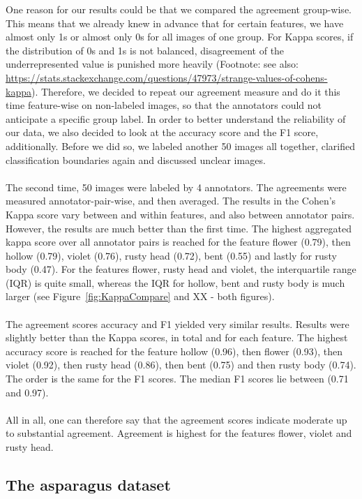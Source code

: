 One reason for our results could be that we compared the agreement group-wise. This means that we already knew in advance that for certain features, we have almost only 1s or almost only 0s for all images of one group. For Kappa scores, if the distribution of 0s and 1s is not balanced, disagreement of the underrepresented value is punished more heavily (Footnote: see also: \url{https://stats.stackexchange.com/questions/47973/strange-values-of-cohens-kappa}). Therefore, we decided to repeat our agreement measure and do it this time feature-wise on non-labeled images, so that the annotators could not anticipate a specific group label. In order to better understand the reliability of our data, we also decided to look at the accuracy score and the F1 score, additionally. Before we did so, we labeled another 50 images all together, clarified classification boundaries again and discussed unclear images. \\
\\
The second time, 50 images were labeled by 4 annotators. The agreements were measured annotator-pair-wise, and then averaged. The results in the Cohen’s Kappa score vary between and within features, and also between annotator pairs. However, the results are much better than the first time. The highest aggregated kappa score over all annotator pairs is reached for the feature flower (0.79), then hollow (0.79), violet (0.76), rusty head (0.72), bent (0.55) and lastly for rusty body (0.47).
For the features flower, rusty head and violet, the interquartile range (IQR) is quite small, whereas the IQR for hollow, bent and rusty body is much larger (see Figure~\ref{fig:KappaCompare} and XX - both figures).  \\
\\
The agreement scores accuracy and F1 yielded very similar results. Results were slightly better than the Kappa scores, in total and  for each feature. The highest accuracy score is reached for the feature hollow (0.96), then flower (0.93), then violet (0.92), then rusty head (0.86), then bent (0.75) and then rusty body (0.74). The order is the same for the F1 scores. The median F1 scores lie between (0.71 and 0.97). \\
\\
All in all, one can therefore say that the agreement scores indicate moderate up to substantial agreement. Agreement is highest for the features flower, violet and rusty head.


\subsection{The asparagus dataset}

